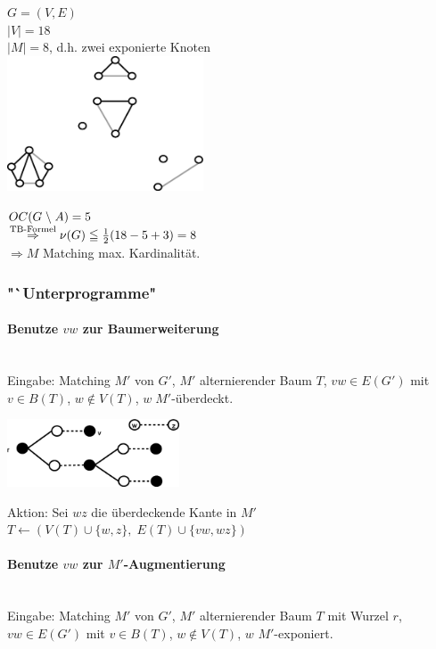 $G=(V,E)$\\
$|V| = 18$\\
$|M| = 8$, d.h. zwei exponierte Knoten\\

\includegraphics[height=4cm]{bilder/5-2altBaum3}

$OC(G\;\backslash\; A) = 5$\\
$\stackrel{\mbox{\scriptsize TB-Formel}}{\Rightarrow} \nu(G) \leqq
\frac{1}{2}(18-5+3)=8$\\
$\Rightarrow M$ Matching max. Kardinalität.

\subsubsection{"`Unterprogramme"}
\paragraph{Benutze $v w$ zur Baumerweiterung} \mbox{}\\
Eingabe: Matching $M'$ von $G'$, $M'$ alternierender Baum $T$, $v w \in
E(G')$ mit $v \in B(T)$, $w\notin V(T)$, $w \; M'$-überdeckt.

\includegraphics[height=2cm]{bilder/5-2vwBaumerw}

Aktion: Sei $w z$ die überdeckende Kante in $M'$\\
$T \leftarrow (V(T) \cup\{w,z\},\; E(T) \cup \{v w, w z\})$

\paragraph{Benutze $v w$ zur $M'$-Augmentierung} \mbox{}\\
Eingabe: Matching $M'$ von $G'$, $M'$ alternierender Baum $T$ mit Wurzel $r$, $v w\in
E(G')$ mit $v \in B(T)$, $w\notin V(T)$, $w$ $M'$-exponiert.

